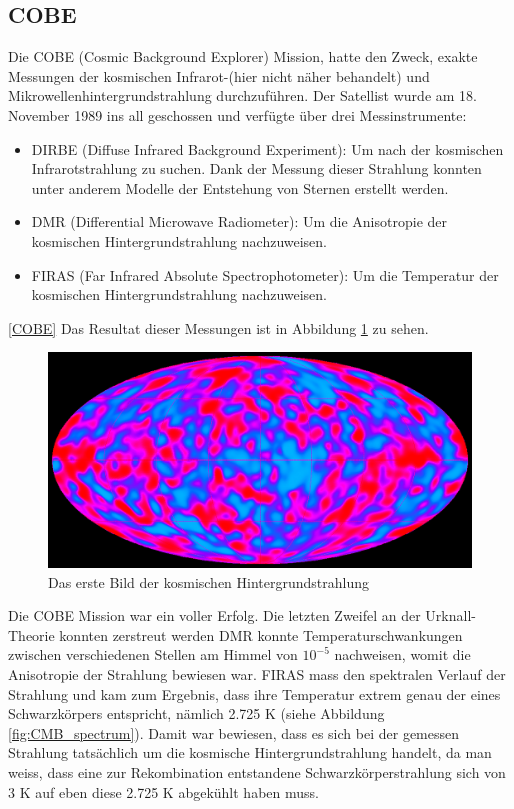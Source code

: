 \subsection{COBE}
Die COBE (Cosmic Background Explorer) Mission, hatte den Zweck, exakte 
Messungen der kosmischen Infrarot-(hier nicht näher behandelt) und 
Mikrowellenhintergrundstrahlung durchzuführen.
Der Satellist wurde am 18. November 1989 ins all geschossen und verfügte über 
drei Messinstrumente:
\begin{itemize}
	\item DIRBE (Diffuse Infrared Background Experiment): Um nach der 
	kosmischen Infrarotstrahlung zu suchen.
	Dank der Messung dieser Strahlung konnten unter anderem Modelle der 
	Entstehung von Sternen erstellt werden.
	\item DMR (Differential Microwave Radiometer): Um die Anisotropie der 
	kosmischen Hintergrundstrahlung nachzuweisen.
	\item FIRAS (Far Infrared Absolute Spectrophotometer): Um die Temperatur 
	der kosmischen Hintergrundstrahlung nachzuweisen. 
\end{itemize}
\ref{COBE}
Das Resultat dieser Messungen ist in Abbildung \ref{fig:COBE} zu sehen.
\begin{figure}
	\includegraphics[width=\linewidth]{cmb/images/COBE_CMB.jpg}
	\caption{Das erste Bild der kosmischen Hintergrundstrahlung}
	\label{fig:COBE}
\end{figure}
Die COBE Mission war ein voller Erfolg.
Die letzten Zweifel an der Urknall-Theorie konnten zerstreut werden
DMR konnte Temperaturschwankungen zwischen verschiedenen Stellen am Himmel 
von $10^{-5}$ nachweisen, womit die Anisotropie der Strahlung bewiesen war.
FIRAS mass den spektralen Verlauf der Strahlung und kam zum Ergebnis, dass ihre 
Temperatur extrem genau der eines Schwarzkörpers entspricht, nämlich 2.725 K 
(siehe Abbildung \ref{fig:CMB_spectrum}).
Damit war bewiesen, dass es sich bei der gemessen Strahlung tatsächlich um die 
kosmische Hintergrundstrahlung handelt, da man weiss, dass eine zur 
Rekombination entstandene Schwarzkörperstrahlung sich von 3 K auf eben diese 
2.725 K abgekühlt haben muss.

